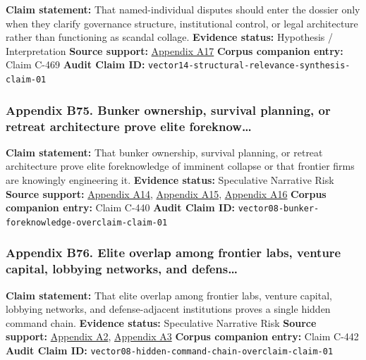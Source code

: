 \documentclass[
  american,
  11pt,
  letterpaper,
]{article}
\begin{document}
\textbf{Claim statement:} That named-individual disputes should enter
the dossier only when they clarify governance structure, institutional
control, or legal architecture rather than functioning as scandal
collage. \textbf{Evidence status:} Hypothesis / Interpretation
\textbf{Source support:}
\hyperref[appendix-a17-musk-v-altman-4-24-cv-04722]{Appendix A17}
\textbf{Corpus companion entry:} Claim C-469 \textbf{Audit Claim ID:}
\texttt{vector14-structural-relevance-synthesis-claim-01}

\subsubsection{Appendix B75. Bunker ownership, survival planning, or
retreat architecture prove elite
foreknow\ldots{}}\label{appendix-b75-bunker-ownership-survival-planning-or-retreat-architecture-prove-elite-foreknow}

\textbf{Claim statement:} That bunker ownership, survival planning, or
retreat architecture prove elite foreknowledge of imminent collapse or
that frontier firms are knowingly engineering it. \textbf{Evidence
status:} Speculative Narrative Risk \textbf{Source support:}
\hyperref[appendix-a14-sam-altman-s-manifest-destiny]{Appendix A14},
\hyperref[appendix-a15-inside-mark-zuckerbergs-top-secret-hawaii-compound]{Appendix
A15},
\hyperref[appendix-a16-mark-zuckerberg-downplays-his-5-000-square-foot-underground-bunker-in-hawaii-just-a-little-shelter]{Appendix
A16} \textbf{Corpus companion entry:} Claim C-440 \textbf{Audit Claim
ID:} \texttt{vector08-bunker-foreknowledge-overclaim-claim-01}

\subsubsection{Appendix B76. Elite overlap among frontier labs, venture
capital, lobbying networks, and
defens\ldots{}}\label{appendix-b76-elite-overlap-among-frontier-labs-venture-capital-lobbying-networks-and-defens}

\textbf{Claim statement:} That elite overlap among frontier labs,
venture capital, lobbying networks, and defense-adjacent institutions
proves a single hidden command chain. \textbf{Evidence status:}
Speculative Narrative Risk \textbf{Source support:}
\hyperref[appendix-a2-openai-appoints-former-top-us-cyberwarrior-paul-nakasone-to-its-board-of-directors]{Appendix
A2},
\hyperref[appendix-a3-anthropic-outspends-openai-in-biggest-ever-lobbying-quarter]{Appendix
A3} \textbf{Corpus companion entry:} Claim C-442 \textbf{Audit Claim
ID:} \texttt{vector08-hidden-command-chain-overclaim-claim-01}
\end{document}
